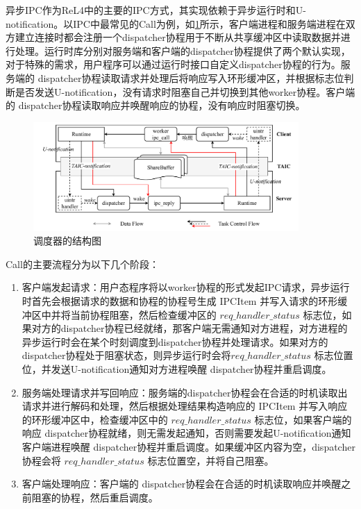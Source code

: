异步IPC作为ReL4中的主要的IPC方式，其实现依赖于异步运行时和U-notification。以IPC中最常见的Call为例，如\ref{fig:async_ipc}所示，客户端进程和服务端进程在双方建立连接时都会注册一个dispatcher协程用于不断从共享缓冲区中读取数据并进行处理。运行时库分别对服务端和客户端的dispatcher协程提供了两个默认实现，对于特殊的需求，用户程序可以通过运行时接口自定义dispatcher协程的行为。服务端的 dispatcher协程读取请求并处理后将响应写入环形缓冲区，并根据标志位判断是否发送U-notification，没有请求时阻塞自己并切换到其他worker协程。客户端的 dispatcher协程读取响应并唤醒响应的协程，没有响应时阻塞切换。

\begin{figure}[htbp]
    \centering
    \includegraphics[width=0.9\textwidth]{figures/async_ipc.drawio.pdf}
    \caption{调度器的结构图}\label{fig:async_ipc}
  \end{figure}

Call的主要流程分为以下几个阶段：
\begin{enumerate}
    \item 客户端发起请求：用户态程序将以worker协程的形式发起IPC请求，异步运行时首先会根据请求的数据和协程的协程号生成 IPCItem 并写入请求的环形缓冲区中并将当前协程阻塞，然后检查缓冲区的 $req\_handler\_status$ 标志位，如果对方的dispatcher协程已经就绪，那客户端无需通知对方进程，对方进程的异步运行时会在某个时刻调度到dispatcher协程并处理请求。如果对方的dispatcher协程处于阻塞状态，则异步运行时会将$req\_handler\_status$ 标志位置位，并发送U-notification通知对方进程唤醒 dispatcher协程并重启调度。
    \item 服务端处理请求并写回响应：服务端的dispatcher协程会在合适的时机读取出请求并进行解码和处理，然后根据处理结果构造响应的 IPCItem 并写入响应的环形缓冲区中，检查缓冲区中的 $req\_handler\_status$  标志位，如果客户端的响应 dispatcher协程就绪，则无需发起通知，否则需要发起U-notification通知客户端进程唤醒 dispatcher协程并重启调度。如果缓冲区内容为空，dispatcher协程会将 $req\_handler\_status$  标志位置空，并将自己阻塞。
    \item 客户端处理响应：客户端的 dispatcher协程会在合适的时机读取响应并唤醒之前阻塞的协程，然后重启调度。
\end{enumerate}

